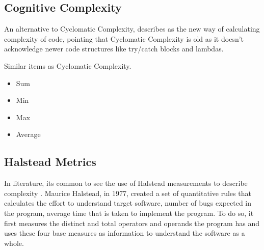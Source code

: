 \subsection{Cognitive Complexity}

An alternative to Cyclomatic Complexity, \cite{article:sonarpaper} describes as the new way of calculating complexity of code,
pointing that Cyclomatic Complexity is old as it doesn't acknowledge newer code structures like try/catch blocks and lambdas.

Similar items as Cyclomatic Complexity.

\begin{itemize}
  \item Sum 
  \item Min 
  \item Max 
  \item Average 
\end{itemize}

\subsection{Halstead Metrics}

In literature, its common to see the use of Halstead measurements to describe complexity
\cite{article:complexity_with_halstead}.
Maurice Halstead, in 1977, created a set of quantitative rules that calculates the effort to understand target software,
number of bugs expected in the program, average time that is taken to implement the program.
To do so, it first measures the distinct and total operators and operands the program has and uses these four base
measures as information to understand the software as a whole.

